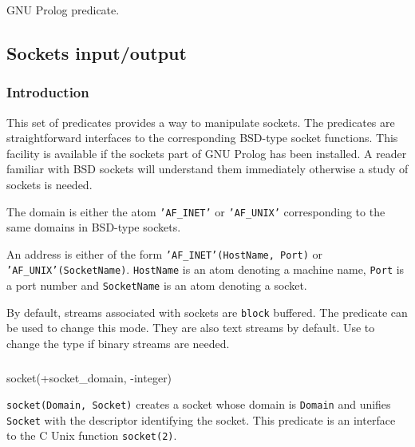 \Portability

GNU Prolog predicate.

\subsection{Sockets input/output}
\label{Sockets-input/output}

\subsubsection{Introduction}
\label{Introduction:(Sockets-input/output)}
This set of predicates provides a way to manipulate sockets. The predicates
are straightforward interfaces to the corresponding BSD-type socket
functions. This facility is available if the sockets part of GNU Prolog has
been installed. A reader familiar with BSD sockets will understand them
immediately otherwise a study of sockets is needed.

The domain is either the atom \texttt{'AF\_INET'} or \texttt{'AF\_UNIX'}
corresponding to the same domains in BSD-type sockets.

An address is either of the form \texttt{'AF\_INET'(HostName, Port)} or
\texttt{'AF\_UNIX'(SocketName)}. \texttt{HostName} is an atom denoting a
machine name, \texttt{Port} is a port number and \texttt{SocketName} is an
atom denoting a socket.

By default, streams associated with sockets are \texttt{block} buffered. The
predicate  
can be used to change this mode. They are also text streams by default. Use
  to change the type
if binary streams are needed.

\subsubsection{}

\begin{TemplatesOneCol}
socket(+socket\_domain, -integer)

\end{TemplatesOneCol}

\Description

\texttt{socket(Domain, Socket)} creates a socket whose domain is
\texttt{Domain}  and unifies \texttt{Socket}
with the descriptor identifying the socket. This predicate is an interface
to the C Unix function \texttt{socket(2)}.

